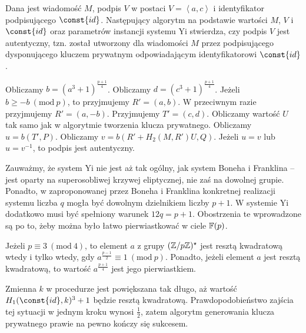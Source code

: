 \begin{algorithm}
Dana jest wiadomość $M$,
podpis $V$ w postaci $V = \left\langle a, c \right\rangle$
i identyfikator podpisującego $\const{id}$.
Następujący algorytm na podstawie wartości $M$, $V$ i $\const{id}$
oraz parametrów instancji systemu Yi
stwierdza, czy podpis $V$ jest autentyczny,
tzn. został utworzony dla wiadomości $M$
przez podpisującego dysponującego kluczem prywatnym
odpowiadającym identyfikatorowi $\const{id}$.

\begin{codebox}
\li
Obliczamy $b = (a^3 + 1)^{\frac{p+1}{4}}$.
\li
Obliczamy $d = (c^3 + 1)^{\frac{p+1}{4}}$.
\li
Jeżeli $b \geq -b\ (\text{mod}\ p)$, to przyjmujemy $R' = (a, b)$.
\li
W przeciwnym razie przyjmujemy $R' = (a, -b)$.
\li
Przyjmujemy $T' = (c, d)$.
\li
Obliczamy wartość $U$ tak samo jak w algorytmie tworzenia klucza prywatnego.
\li
Obliczamy $u = b(T', P)$.
\li
Obliczamy $v = b(R' + H_2(M, R')U, Q)$.
\li
Jeżeli $u = v$ lub $u = v^{-1}$, to podpis jest autentyczny.
\end{codebox}
\end{algorithm}

\noindent
Zauważmy, że system Yi nie jest aż tak ogólny, jak system Boneha i Franklina --
jest oparty na superosobliwej krzywej eliptycznej,
nie zaś na dowolnej grupie.
Ponadto, w zaproponowanej przez Boneha i Franklina
konkretnej realizacji systemu
liczba $q$ mogła być dowolnym dzielnikiem liczby $p+1$.
W systemie Yi dodatkowo musi być spełniony warunek $12q = p+1$.
Obostrzenia te wprowadzone są po to,
żeby można było łatwo pierwiastkować w ciele $\mathbb{F}(p)$.

\begin{remark}
Jeżeli $p \equiv 3\ (\text{mod}\ 4)$,
to element $a$ z grupy $(\mathbb{Z}/p\mathbb{Z})^\star$
jest resztą kwadratową wtedy i tylko wtedy,
gdy $a^{\frac{p-1}{2}} \equiv 1\ (\text{mod}\ p)$.
Ponadto, jeżeli element $a$ jest resztą kwadratową,
to wartość $a^{\frac{p+1}{4}}$ jest jego pierwiastkiem.
\end{remark}

\begin{remark}
Zmienna $k$ w procedurze 
jest powiększana tak długo,
aż wartość $H_1(\const{id}, k)^3 + 1$ będzie resztą kwadratową.
Prawdopodobieństwo zajścia tej sytuacji w jednym kroku wynosi $\frac{1}{2}$,
zatem algorytm generowania klucza prywatnego
prawie na pewno kończy się sukcesem.
\end{remark}

